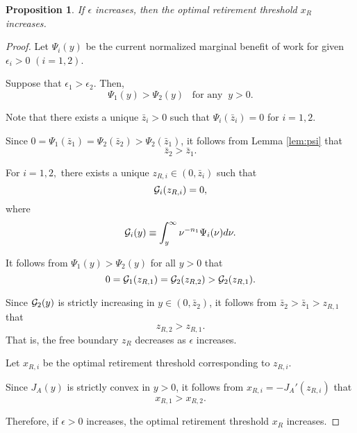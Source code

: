 \documentclass[a4paper,report, 11pt]{article}
\newtheorem{pro}{Proposition}[section]
\def\e{\epsilon}
\begin{document}
\begin{pro}\label{pro:wealth-boundary}
	If $\e$ increases, then the optimal retirement threshold $x_R$ increases.
\end{pro}
\begin{proof}
	
Let $\Psi_i(y)$ be the current normalized marginal benefit of work for given $\e_i>0$ $(i=1,2)$. 

Suppose that $\e_1>\e_2$. Then, 
$$
\Psi_1(y)>\Psi_2(y) \;\;\;\mbox{for any}\;\;y>0.
$$

Note that there exists a unique $\bar{z}_i>0$ such that $\Psi_i(\bar{z}_i)=0$ for $i=1,2$.

Since $0=\Psi_1(\bar{z}_1)=\Psi_2(\bar{z}_2)>\Psi_2(\bar{z}_1)$, it follows from Lemma \ref{lem:psi} that
$$
\bar{z}_2 >\bar{z}_1. 
$$ 

For $i=1,2,$ there exists a unique $z_{R,i}\in(0,\bar{z}_i)$ such that 
\begin{equation*}
{\cal G}_i(z_{R,i})=0,
\end{equation*}
where 
$$
{\cal G}_i(y)\equiv \int_y^\infty \nu^{-n_1}\Psi_i(\nu)d\nu.
$$

It follows from $\Psi_1(y)>\Psi_2(y)$ for all $y>0$ that 
\begin{equation*}
0={\cal G}_1(z_{R,1})={\cal G}_2(z_{R,2})>{\cal G}_2(z_{R,1}).
\end{equation*}

Since ${\cal G}_2(y)$ is strictly increasing in $y\in(0,\bar{z}_2)$, it follows from $\bar{z}_2>\bar{z}_1>z_{R,1}$ that 
\begin{equation*}
z_{R,2}>z_{R,1}. 
\end{equation*}
That is, the free boundary $z_R$ decreases as $\e$ increases. 

Let $x_{R,i}$ be the optimal retirement threshold corresponding to $z_{R,i}$. 

Since $J_A(y)$ is strictly convex in $y>0$, it follows from $x_{R,i}=-J_A'(z_{R,i})$ that 
\begin{equation*}
x_{R,1}>x_{R,2}. 
\end{equation*}

Therefore, if $\e>0$ increases, the optimal retirement threshold $x_R$ increases.

\end{proof}
\end{document}
